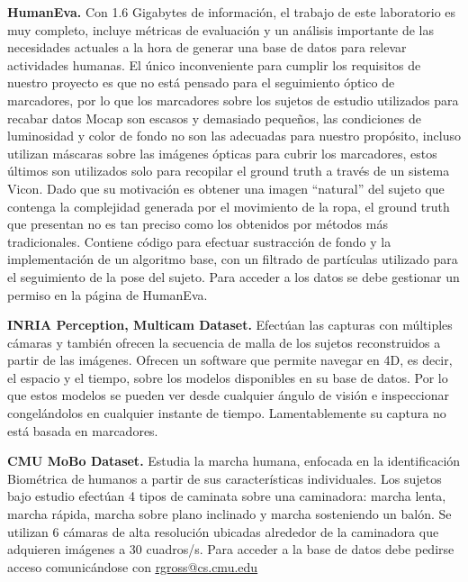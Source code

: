 \textbf{HumanEva.}
Con 1.6 Gigabytes de información, el trabajo de este laboratorio es muy completo, incluye métricas de evaluación y un análisis importante de las necesidades actuales a la hora de generar una base de datos para relevar actividades humanas. El único inconveniente para cumplir los requisitos de nuestro proyecto es que no está pensado para el seguimiento óptico de marcadores, por lo que los marcadores sobre los sujetos de estudio utilizados para recabar datos Mocap son escasos y demasiado pequeños, las condiciones de luminosidad y color de fondo no son las adecuadas para nuestro propósito, incluso utilizan máscaras sobre las imágenes ópticas para cubrir los marcadores, estos últimos son utilizados solo para recopilar el ground truth a través de un sistema Vicon.  Dado que su motivación es obtener una imagen ``natural'' del sujeto que contenga la complejidad generada por el movimiento de la ropa, el ground truth que presentan  no es tan preciso como los obtenidos por métodos más tradicionales.  Contiene código para efectuar sustracción de fondo y la implementación de un algoritmo base, con un filtrado de partículas utilizado para el seguimiento de la pose del sujeto. Para acceder a los datos se debe gestionar un permiso en la página de HumanEva. 

\textbf{INRIA Perception, Multicam Dataset.}
Efectúan las capturas con múltiples cámaras y también ofrecen la secuencia de malla de los sujetos reconstruidos a partir de las imágenes. Ofrecen un software que permite navegar en 4D, es decir, el espacio y el tiempo, sobre los modelos disponibles en su base de datos. Por lo que estos modelos se pueden ver desde cualquier ángulo de visión e inspeccionar congelándolos en cualquier instante de tiempo. Lamentablemente su captura no está basada en marcadores. 

\textbf{CMU MoBo Dataset.}
Estudia la marcha humana, enfocada en la identificación Biométrica de humanos a partir de sus características individuales. Los sujetos bajo estudio efectúan 4 tipos de caminata sobre una caminadora: marcha lenta, marcha rápida, marcha sobre plano inclinado y marcha sosteniendo un balón. Se utilizan 6 cámaras de alta resolución ubicadas alrededor de la caminadora que adquieren imágenes a 30 cuadros/s. Para acceder a la base de datos debe pedirse acceso comunicándose con \textcolor{blue}{\underline{\url{rgross@cs.cmu.edu }}}

